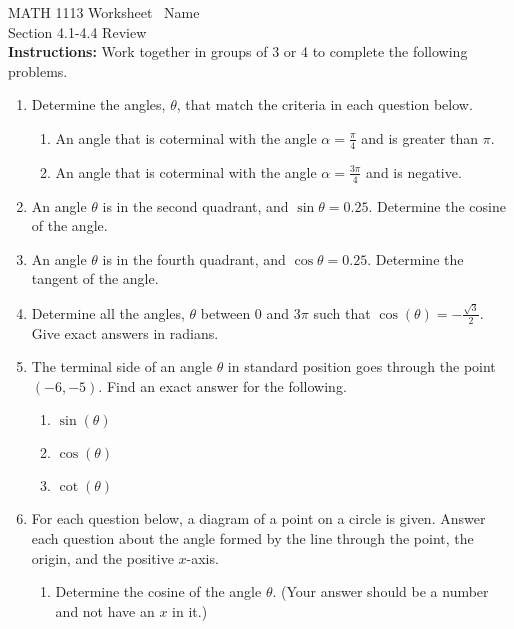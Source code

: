 \documentclass[11pt]{article}
\begin{document}
\noindent MATH 1113   \quad\quad\quad\quad\quad Worksheet \quad\quad\quad\quad\quad\   Name \underline{\phantom{alphabetsoupismyveryveryfavorite}}\\ 
\noindent Section 4.1-4.4 Review \\




\noindent \textbf{Instructions:}  Work together in groups of  3 or 4 to complete the following problems.\\


\begin{enumerate}
\item Determine the angles, $\theta$, that match the criteria in each question below.
\begin{enumerate}
\item An angle that is coterminal with the angle $\alpha=\frac{\pi}{4}$ and is greater than $\pi$.\vfill
\item An angle that is coterminal with the angle $\alpha=\frac{3\pi}{4}$ and is negative.\vfill
\end{enumerate}

\item An angle $\theta$ is in the second quadrant, and $\sin{\theta}=0.25$.  Determine the cosine of the angle.\vfill

\item An angle $\theta$ is in the fourth quadrant, and $\cos{\theta}=0.25$.  Determine the tangent of the angle.\vfill

\item Determine all the angles, $\theta$ between 0 and $3\pi$ such that $\cos{(\theta)}=-\frac{\sqrt{3}}{2}$.  Give exact answers in radians.\vfill

\newpage


\item The terminal side of an angle $\theta$ in standard position goes through the point $(-6,-5).$  Find an exact answer for the following.
\begin{enumerate}
\item $\sin{(\theta)}$\vfill
\item $\cos{(\theta)}$\vfill
\item $\cot{(\theta)}$\vfill

\end{enumerate}

\item For each question below, a diagram of a point on a circle is given.  Answer each question about the angle formed by the line through the point, the origin, and the positive $x$-axis.
\begin{enumerate}
\item Determine the cosine of the angle $\theta$.  (Your answer should be a number and not have an $x$ in it.)\\
\end{enumerate}
\end{enumerate}
\end{document}
